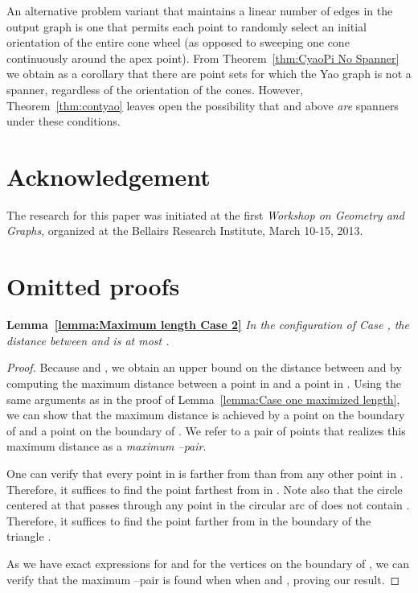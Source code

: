 \documentclass{cccg14}
\begin{document}
An alternative problem variant that maintains a linear number of edges in the output graph is one that permits each point to randomly select an  initial orientation of the entire cone wheel (as opposed to sweeping one cone continuously around the apex point). 
From Theorem~\ref{thm:CyaoPi No Spanner} we obtain as a corollary that there are point sets for which the Yao graph  is not a spanner, regardless of the orientation of the cones.
However, Theorem~\ref{thm:contyao} leaves open the possibility that  and above \emph{are} spanners under these conditions.






\section*{Acknowledgement}

The research for this paper was initiated at the first \emph{Workshop on Geometry and Graphs}, organized at the Bellairs Research Institute, March 10-15, 2013.



\small



\newpage
\appendix

\section{Omitted proofs}\label{Appendix}

\textbf{Lemma~\ref{lemma:Maximum length Case 2}}\emph{
In the configuration of Case , the distance between  and  is at most .
}
\begin{proof}
Because  and , we obtain an upper bound on the distance between  and  by computing the maximum distance between a point in  and a point in .
Using the same arguments as in the proof of Lemma~\ref{lemma:Case one maximized length}, we can show that the maximum distance is achieved by a point on the boundary of  and a point on the boundary of .
We refer to a pair of points that realizes this maximum distance as a \emph{maximum --pair}.

One can verify that every point in  is farther from  than from any other point in . Therefore, it suffices to find the point farthest from  in . Note also that the circle centered at  that passes through any point in the circular arc of  does not contain . Therefore, it suffices to find the point farther from  in the boundary of the triangle .

As we have exact expressions for  and for the vertices on the boundary of , we can verify that the maximum --pair is found when when  and , proving our result.\end{proof}
\end{document}

